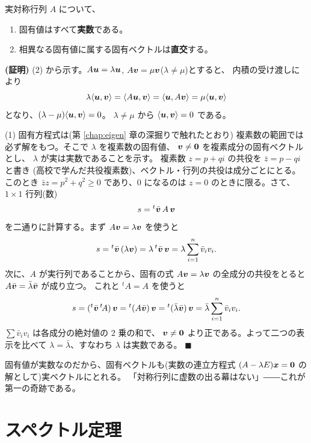 \begin{teiri}[対称行列の基本性質]\label{thm:spec-basic}
実対称行列 $A$ について、
\begin{enumerate}
\item 固有値はすべて\textbf{実数}である。
\item 相異なる固有値に属する固有ベクトルは\textbf{直交}する。
\end{enumerate}
\end{teiri}

\noindent\textbf{(証明)}\quad
(2) から示す。$A\bm{u} = \lambda\bm{u}$,
$A\bm{v} = \mu\bm{v}$($\lambda \neq \mu$)とすると、
内積の受け渡しにより
\[
\lambda \langle \bm{u}, \bm{v} \rangle
= \langle A\bm{u}, \bm{v} \rangle
= \langle \bm{u}, A\bm{v} \rangle
= \mu \langle \bm{u}, \bm{v} \rangle
\]
となり、$(\lambda - \mu)\langle \bm{u}, \bm{v} \rangle = 0$。
$\lambda \neq \mu$ から $\langle \bm{u}, \bm{v} \rangle = 0$ である。

(1) 固有方程式は(第 \ref{chap:eigen} 章の深掘りで触れたとおり)
複素数の範囲では必ず解をもつ。そこで $\lambda$ を複素数の固有値、
$\bm{v} \neq \bm{0}$ を複素成分の固有ベクトルとし、
$\lambda$ が実は実数であることを示す。
複素数 $z = p + qi$ の共役を $\bar{z} = p - qi$ と書き
(高校で学んだ共役複素数)、ベクトル・行列の共役は成分ごとにとる。
このとき $\bar{z}z = p^2 + q^2 \ge 0$ であり、$0$ になるのは $z = 0$
のときに限る。さて、$1 \times 1$ 行列(数)
\[
s = {}^t\bar{\bm{v}}\,A\,\bm{v}
\]
を二通りに計算する。まず $A\bm{v} = \lambda\bm{v}$ を使うと
\[
s = {}^t\bar{\bm{v}}\,(\lambda\bm{v})
= \lambda\,{}^t\bar{\bm{v}}\,\bm{v}
= \lambda \sum_{i=1}^{n} \bar{v}_i v_i.
\]
次に、$A$ が実行列であることから、固有の式
$A\bm{v} = \lambda\bm{v}$ の全成分の共役をとると
$A\bar{\bm{v}} = \bar{\lambda}\bar{\bm{v}}$ が成り立つ。
これと ${}^t\!A = A$ を使うと
\[
s = ({}^t\bar{\bm{v}}\,{}^t\!A)\,\bm{v}
= {}^t(A\bar{\bm{v}})\,\bm{v}
= {}^t(\bar{\lambda}\bar{\bm{v}})\,\bm{v}
= \bar{\lambda} \sum_{i=1}^{n} \bar{v}_i v_i.
\]
$\sum \bar{v}_iv_i$ は各成分の絶対値の $2$ 乗の和で、
$\bm{v} \neq \bm{0}$ より正である。よって二つの表示を比べて
$\lambda = \bar{\lambda}$、すなわち $\lambda$ は実数である。
$\blacksquare$

固有値が実数なのだから、固有ベクトルも(実数の連立方程式
$(A - \lambda E)\bm{x} = \bm{0}$ の解として)実ベクトルにとれる。
「対称行列に虚数の出る幕はない」――これが第一の奇跡である。

\section{スペクトル定理}

